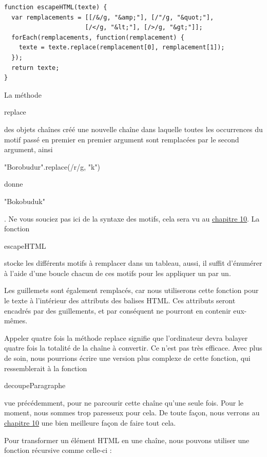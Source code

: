 \documentclass{FramateX}
\renewcommand{\texttt}[1]{\begin{sffamily}{#1}\end{sffamily}}
\begin{document}
\begin{lstlisting}
function escapeHTML(texte) {
  var remplacements = [[/&/g, "&amp;"], [/"/g, "&quot;"],
                      [/</g, "&lt;"], [/>/g, "&gt;"]];
  forEach(remplacements, function(remplacement) {
    texte = texte.replace(remplacement[0], remplacement[1]);
  });
  return texte;
}
\end{lstlisting}
La méthode \texttt{replace} des objets chaînes créé une nouvelle chaîne
dans laquelle toutes les occurrences du motif passé en premier en
premier argument sont remplacées par le second argument, ainsi
\texttt{"Borobudur".replace(/r/g, "k")} donne \texttt{"Bokobuduk"}. Ne
vous souciez pas ici de la syntaxe des motifs, cela sera vu au
\href{chapter10.html}{chapitre 10}. La fonction \texttt{escapeHTML}
stocke les différents motifs à remplacer dans un tableau, aussi, il
suffit d'énumérer à l'aide d'une boucle chacun de ces motifs pour les
appliquer un par un.

Les guillemets sont également remplacés, car nous utiliserons cette
fonction pour le texte à l'intérieur des attributs des balises HTML. Ces
attributs seront encadrés par des guillements, et par conséquent ne
pourront en contenir eux-mêmes.

Appeler quatre fois la méthode replace signifie que l'ordinateur devra
balayer quatre fois la totalité de la chaîne à convertir. Ce n'est pas
très efficace. Avec plus de soin, nous pourrions écrire une version plus
complexe de cette fonction, qui ressemblerait à la fonction
\texttt{decoupeParagraphe} vue précédemment, pour ne parcourir cette
chaîne qu'une seule fois. Pour le moment, nous sommes trop paresseux
pour cela. De toute façon, nous verrons au
\href{chapter10.html}{chapitre 10} une bien meilleure façon de faire
tout cela.

\begin{center}\end{center}

Pour transformer un élément HTML en une chaîne, nous pouvons utiliser
une fonction récursive comme celle-ci :
\end{document}
